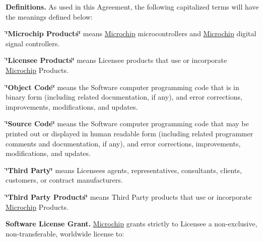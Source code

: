 \begin{DoxyEnumerate}
\item {\bfseries Definitions.} As used in this Agreement, the following capitalized terms will have the meanings defined below\+:


\begin{DoxyEnumerate}
\item {\bfseries \char`\"{}\+Microchip Products\char`\"{}} means \hyperlink{namespace_microchip}{Microchip} microcontrollers and \hyperlink{namespace_microchip}{Microchip} digital signal controllers. 
\item {\bfseries \char`\"{}\+Licensee Products\char`\"{}} means Licensee products that use or incorporate \hyperlink{namespace_microchip}{Microchip} Products. 
\item {\bfseries \char`\"{}\+Object Code\char`\"{}} means the Software computer programming code that is in binary form (including related documentation, if any), and error corrections, improvements, modifications, and updates. 
\item {\bfseries \char`\"{}\+Source Code\char`\"{}} means the Software computer programming code that may be printed out or displayed in human readable form (including related programmer comments and documentation, if any), and error corrections, improvements, modifications, and updates. 
\item {\bfseries \char`\"{}\+Third Party\char`\"{}} means Licensee\textquotesingle{}s agents, representatives, consultants, clients, customers, or contract manufacturers. 
\item {\bfseries \char`\"{}\+Third Party Products\char`\"{}} means Third Party products that use or incorporate \hyperlink{namespace_microchip}{Microchip} Products. 
\end{DoxyEnumerate}


\item {\bfseries Software License Grant.} \hyperlink{namespace_microchip}{Microchip} grants strictly to Licensee a non-\/exclusive, non-\/transferable, worldwide license to\+:



\end{DoxyEnumerate}
